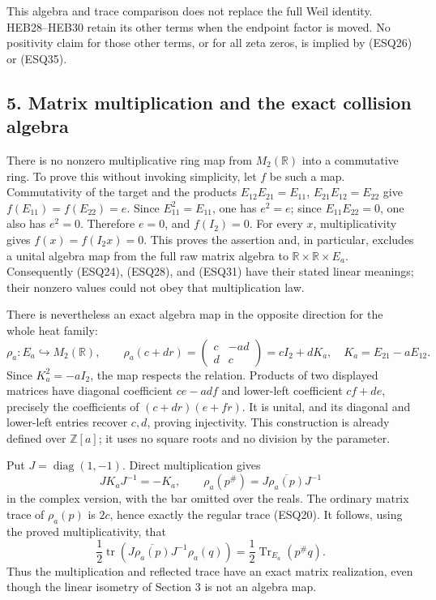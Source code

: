 \documentclass[
  10pt,
  a4paper,
]{article}
\begin{document}
This algebra and trace comparison does not replace the full Weil
identity. HEB28--HEB30 retain its other terms when the endpoint factor
is moved. No positivity claim for those other terms, or for all zeta
zeros, is implied by (ESQ26) or (ESQ35).

\subsection{5. Matrix multiplication and the exact collision
algebra}\label{matrix-multiplication-and-the-exact-collision-algebra}

There is no nonzero multiplicative ring map from \(M_2(\mathbb R)\) into
a commutative ring. To prove this without invoking simplicity, let \(f\)
be such a map. Commutativity of the target and the products
\(E_{12}E_{21}=E_{11}\), \(E_{21}E_{12}=E_{22}\) give
\(f(E_{11})=f(E_{22})=e\). Since \(E_{11}^2=E_{11}\), one has \(e^2=e\);
since \(E_{11}E_{22}=0\), one also has \(e^2=0\). Therefore \(e=0\), and
\(f(I_2)=0\). For every \(x\), multiplicativity gives
\(f(x)=f(I_2x)=0\). This proves the assertion and, in particular,
excludes a unital algebra map from the full raw matrix algebra to
\(\mathbb R\times\mathbb R\times E_a\). Consequently (ESQ24), (ESQ28),
and (ESQ31) have their stated linear meanings; their nonzero values
could not obey that multiplication law.

There is nevertheless an exact algebra map in the opposite direction for
the whole heat family: \[
\rho_a:E_a\hookrightarrow M_2(\mathbb R),\qquad
\rho_a(c+dr)=\begin{pmatrix}c&-ad\\d&c\end{pmatrix}
=cI_2+dK_a,
\quad K_a=E_{21}-aE_{12}.
\tag{ESQ36}
\] Since \(K_a^2=-aI_2\), the map respects the relation. Products of two
displayed matrices have diagonal coefficient \(ce-a df\) and lower-left
coefficient \(cf+de\), precisely the coefficients of \((c+dr)(e+fr)\).
It is unital, and its diagonal and lower-left entries recover \(c,d\),
proving injectivity. This construction is already defined over
\(\mathbb Z[a]\); it uses no square roots and no division by the
parameter.

Put \(J=\operatorname{diag}(1,-1)\). Direct multiplication gives \[
JK_aJ^{-1}=-K_a,\qquad
\rho_a(p^\#)=J\overline{\rho_a(p)}J^{-1}
\tag{ESQ37}
\] in the complex version, with the bar omitted over the reals. The
ordinary matrix trace of \(\rho_a(p)\) is \(2c\), hence exactly the
regular trace (ESQ20). It follows, using the proved multiplicativity,
that \[
\frac12\operatorname{tr}\!\left(J\overline{\rho_a(p)}J^{-1}\rho_a(q)\right)
=\frac12\operatorname{Tr}_{E_a}(p^\#q).
\tag{ESQ38}
\] Thus the multiplication and reflected trace have an exact matrix
realization, even though the linear isometry of Section 3 is not an
algebra map.
\end{document}
